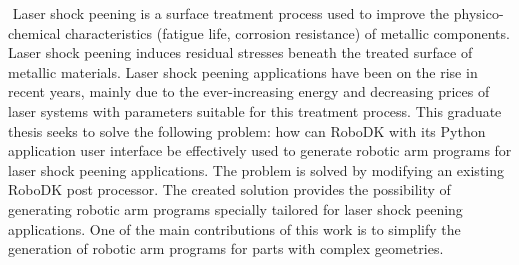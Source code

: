 ﻿%
﻿
Laser shock peening is a surface treatment process used to improve the physico-chemical characteristics (fatigue life, corrosion resistance) of metallic components. Laser shock peening induces residual stresses beneath the treated surface of metallic materials. Laser shock peening applications have been on the rise in recent years, mainly due to the ever-increasing energy and decreasing prices of laser systems with parameters suitable for this treatment process. This graduate thesis seeks to solve the following problem: how can RoboDK with its Python application user interface be effectively used to generate robotic arm programs for laser shock peening applications. The problem is solved by modifying an existing RoboDK post processor. The created solution provides the possibility of generating robotic arm programs specially tailored for laser shock peening applications. One of the main contributions of this work is to simplify the generation of robotic arm programs for parts with complex geometries.


